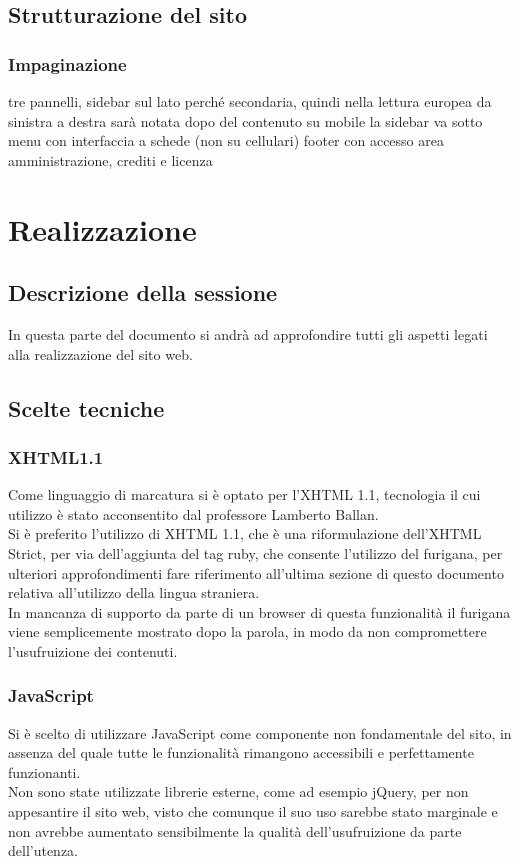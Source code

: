 \documentclass[openany, a4paper, 12pt]{report}
\begin{document}
	\section{Strutturazione del sito}
	\subsection{Impaginazione}
	tre pannelli, sidebar sul lato perché secondaria, quindi nella lettura europea da sinistra a destra sarà notata dopo del contenuto
	su mobile la sidebar va sotto
	menu con interfaccia a schede (non su cellulari)
	footer con accesso area amministrazione, crediti e licenza
	
	
	\chapter{Realizzazione}
	\section{Descrizione della sessione}
	In questa parte del documento si andrà ad approfondire tutti gli aspetti legati alla realizzazione del sito web.
	
	\section{Scelte tecniche}
	\subsection{XHTML1.1}
	Come linguaggio di marcatura si è optato per l'XHTML 1.1, tecnologia il cui utilizzo è stato acconsentito dal professore Lamberto Ballan.\\
	Si è preferito l'utilizzo di XHTML 1.1, che è una riformulazione dell'XHTML Strict, per via dell'aggiunta del tag ruby, che consente l'utilizzo del furigana, per ulteriori approfondimenti fare riferimento all'ultima sezione di questo documento relativa all'utilizzo della lingua straniera.\\
	In mancanza di supporto da parte di un browser di questa funzionalità il furigana viene semplicemente mostrato dopo la parola, in modo da non compromettere l'usufruizione dei contenuti.
	
	\subsection{JavaScript}
	Si è scelto di utilizzare JavaScript come componente non fondamentale del sito, in assenza del quale tutte le funzionalità rimangono accessibili e perfettamente funzionanti.\\
	Non sono state utilizzate librerie esterne, come ad esempio jQuery, per non appesantire il sito web, visto che comunque il suo uso sarebbe stato marginale e non avrebbe aumentato sensibilmente la qualità dell'usufruizione da parte dell'utenza.
	
\end{document}
